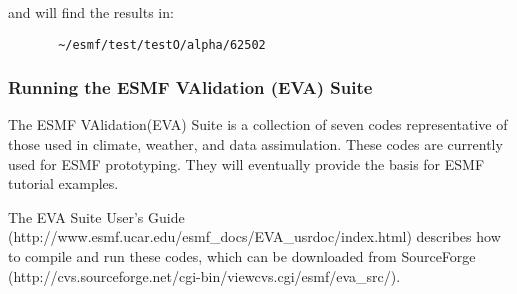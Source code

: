 and will find the results in:
\begin{verbatim}
       ~/esmf/test/testO/alpha/62502 
\end{verbatim}

\subsubsection{Running the ESMF VAlidation (EVA) Suite}
\label{EVATestDescription}

The ESMF VAlidation(EVA) Suite is a collection of seven codes representative of those used in climate, 
weather, and data assimulation. These codes are currently used for ESMF prototyping. They will eventually 
provide the basis for ESMF tutorial examples.

The EVA Suite User's Guide (http://www.esmf.ucar.edu/esmf\_docs/EVA\_usrdoc/index.html) describes how to 
compile and run these codes, which can be downloaded from 
SourceForge (http://cvs.sourceforge.net/cgi-bin/viewcvs.cgi/esmf/eva\_src/). 




























